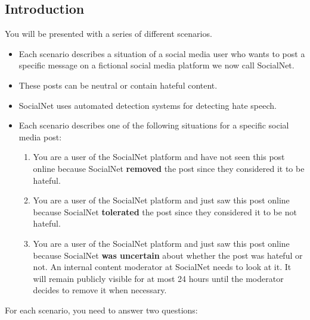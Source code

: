 \documentclass[a4paper]{article}
\begin{document}
\subsection{Introduction}
You will be presented with a series of different scenarios.
\begin{itemize}
    \item Each scenario describes a situation of a social media user who wants to post a specific message on a fictional social media platform we now call SocialNet.
    \item These posts can be neutral or contain hateful content.
    \item SocialNet uses automated detection systems for detecting hate speech.
    \item Each scenario describes one of the following situations for a specific social media post:
          \begin{enumerate}
              \item You are a user of the SocialNet platform and have not seen this post online because SocialNet \textbf{removed} the post since they considered it to be hateful.
              \item You are a user of the SocialNet platform and just saw this post online because SocialNet \textbf{tolerated} the post since they considered it to be not hateful.
              \item You are a user of the SocialNet platform and just saw this post online because SocialNet \textbf{was uncertain} about whether the post was hateful or not. An internal content moderator at SocialNet needs to look at it. It will remain publicly visible for at most 24 hours until the moderator decides to remove it when necessary.
          \end{enumerate}
\end{itemize}

For each scenario, you need to answer two questions:
\end{document}

